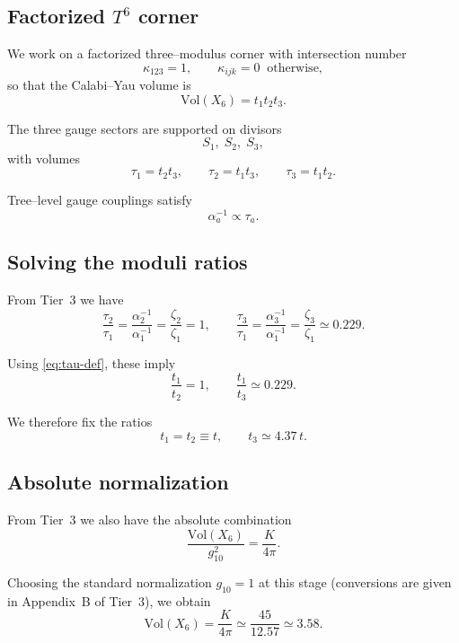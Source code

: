 \documentclass[11pt]{article}
\begin{document}
\subsection{Factorized $T^6$ corner}

We work on a factorized three--modulus corner with intersection number
\[
\kappa_{123} = 1,
\qquad
\kappa_{ijk} = 0 \;\; \text{otherwise},
\]
so that the Calabi--Yau volume is
\begin{equation}
\mathrm{Vol}(X_6) = t_1 t_2 t_3.
\label{eq:CY-volume-exec}
\end{equation}

The three gauge sectors are supported on divisors
\[
S_1,\; S_2,\; S_3,
\]
with volumes
\begin{equation}
\tau_1 = t_2 t_3,
\qquad
\tau_2 = t_1 t_3,
\qquad
\tau_3 = t_1 t_2.
\label{eq:tau-def}
\end{equation}

Tree--level gauge couplings satisfy
\[
\alpha_a^{-1} \propto \tau_a.
\]

\subsection{Solving the moduli ratios}

From Tier~3 we have
\[
\frac{\tau_2}{\tau_1}
=
\frac{\alpha_2^{-1}}{\alpha_1^{-1}}
=
\frac{\zeta_2}{\zeta_1}
= 1,
\qquad
\frac{\tau_3}{\tau_1}
=
\frac{\alpha_3^{-1}}{\alpha_1^{-1}}
=
\frac{\zeta_3}{\zeta_1}
\simeq 0.229.
\]

Using \eqref{eq:tau-def}, these imply
\begin{equation}
\frac{t_1}{t_2} = 1,
\qquad
\frac{t_1}{t_3} \simeq 0.229.
\end{equation}

We therefore fix the ratios
\begin{equation}
t_1 = t_2 \equiv t,
\qquad
t_3 \simeq 4.37\, t.
\label{eq:t-ratios}
\end{equation}

\subsection{Absolute normalization}

From Tier~3 we also have the absolute combination
\[
\frac{\mathrm{Vol}(X_6)}{g_{10}^2} = \frac{K}{4\pi}.
\]

Choosing the standard normalization \(g_{10}=1\) at this stage
(conversions are given in Appendix~B of Tier~3), we obtain
\begin{equation}
\mathrm{Vol}(X_6)
=
\frac{K}{4\pi}
\simeq
\frac{45}{12.57}
\simeq
3.58.
\end{equation}
\end{document}
